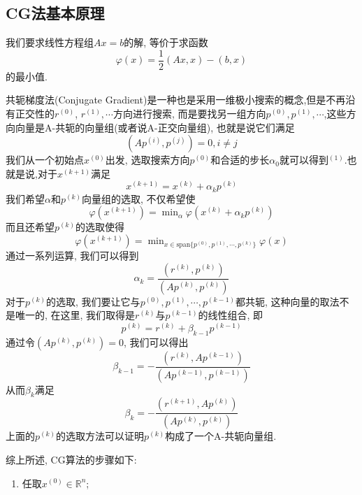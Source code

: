 \documentclass[a4paper]{article}
\begin{document}
\begin{CJK*}{GBK}{song}
\subsection{CG法基本原理}
我们要求线性方程组$Ax=b$的解, 等价于求函数
\begin{equation}
\varphi(x)=\frac{1}{2}(Ax,x)-(b,x)
\end{equation}
的最小值.\par
共轭梯度法(Conjugate Gradient)是一种也是采用一维极小搜索的概念,但是不再沿有正交性的$r^{(0)}$, $r^{(1)},\cdots$方向进行搜索, 而是要找另一组方向$p^{(0)},p^{(1)},\cdots$,这些方向向量是A-共轭的向量组(或者说A-正交向量组), 也就是说它们满足
\begin{equation}
(Ap^{(i)}, p^{(j)})=0, i\neq j
\end{equation}
我们从一个初始点$x^{(0)}$出发, 选取搜索方向$p^{(0)}$和合适的步长$\alpha_0$就可以得到$^{(1)}$.也就是说,对于$x^{(k+1)}$满足
\begin{equation}
x^{(k+1)}=x^{(k)}+\alpha_kp^{(k)}
\end{equation}
我们希望$\alpha$和${p^{(k)}}$向量组的选取, 不仅希望使
\begin{equation}
\varphi(x^{(k+1)})=\mathop{\text{min}}_{\alpha} \varphi(x^{(k)}+\alpha_kp^{(k)})
\end{equation}
而且还希望${p^{(k)}}$的选取使得
\begin{equation}
\varphi(x^{(k+1)})=\mathop{\text{min}}_{x\in\text{span}\{p^{(0)},p^{(1)},\cdots,p^{(k)}\}} \varphi(x)
\end{equation}
通过一系列运算, 我们可以得到
\begin{equation}
\alpha_k= \frac{(r^{(k)},p^{(k)})}{(Ap^{(k)},p^{(k)})}
\end{equation}
对于$p^{(k)}$的选取, 我们要让它与$p^{(0)},p^{(1)},\cdots,p^{(k-1)}$都共轭, 这种向量的取法不是唯一的, 在这里, 我们取得是$r^{(k)}$与$p^{(k-1)}$的线性组合, 即
\begin{equation}
p^{(k)}=r^{(k)}+\beta_{k-1} p^{(k-1)}
\end{equation}
通过令$(Ap^{(k)},p^{(k)})=0$, 我们可以得出
$$\beta_{k-1}= -\frac{(r^{(k)},Ap^{(k-1)})}{(Ap^{(k-1)},p^{(k-1)})}$$
从而$\beta_k$满足
\begin{equation}
\beta_{k}= -\frac{(r^{(k+1)},Ap^{(k)})}{(Ap^{(k)},p^{(k)})}
\end{equation}
上面的$p^{(k)}$的选取方法可以证明${p^{(k)}}$构成了一个A-共轭向量组.\par
综上所述, CG算法的步骤如下:
\begin{enumerate}[(1)]
\item 任取$x^{(0)}\in \mathbb{R}^n$;

\end{enumerate}
\end{CJK*}
\end{document}
